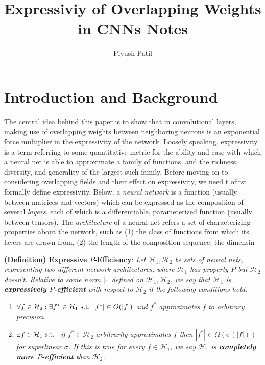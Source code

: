 \documentclass{article}
\begin{document}
\title{Expressiviy of Overlapping Weights in CNNs Notes}
\author{Piyush Patil}
\maketitle

\section{Introduction and Background}
The central idea behind this paper is to show that in convolutional layers, making use of overlapping weights between neighboring neurons is an exponential force multiplier in the expressivity of the network. Loosely speaking, expressivity is a term referring to some quantitative metric for the ability and ease with which a neural net is able to approximate a family of functions, and the richness, diversity, and generality of the largest such family.
\newline \newline
Before moving on to considering overlapping fields and their effect on expressivity, we need t ofirst formally define expressivity. Below, a \textit{neural network} is a function (usually between matrices and vectors) which can be expressed as the composition of several \textit{layers}, each of which is a differentiable, parameterized function (usually between tensors). The \textit{architecture} of a neural net refers a set of characterizing properties about the network, such as (1) the class of functions from which its layers are drawn from, (2) the length of the composition sequence, the dimensin
\newline
\begin{adjustwidth}{1cm}{1cm}
    \textbf{(Definition) Expressive $ P $-Efficiency}: \textit{Let $ \mathcal{H}_1, \mathcal{H}_2 $ be sets of neural nets, representing two different network architectures, where $ \mathcal{H}_1 $ has property $ P $ but $ \mathcal{H}_2 $ doesn't. Relative to some norm $ | \cdot | $ defined on $ \mathcal{H}_1, \mathcal{H}_2 $, we say that $ \mathcal{H}_1 $ is \textbf{expressively $ P $-efficient} with respect to $ \mathcal{H}_2 $ if the following conditions hold:}
    \begin{enumerate}
        \item \textit{$ \forall f \in \mathcal{H}_2: \exists f^* \in \mathcal{H}_1 \textnormal{ s.t. } | f^* | \in O(|f|) $ and $ f^* $ approximates $ f $ to arbitrary precision.}
        \item \textit{$ \exists f \in \mathcal{H}_1 \textnormal{ s.t. } $ if $ f^* \in \mathcal{H}_2 $ arbitrarily approximates $ f $ then $ |f^*| \in \Omega(\sigma(|f|)) $ for superlinear $ \sigma $. If this is true for every $ f \in \mathcal{H}_1 $, we say $ \mathcal{H}_1 $ is \textbf{completely more $ P $-efficient} than $ \mathcal{H}_2 $.}
    \end{enumerate}
\end{adjustwidth}
\end{document}
